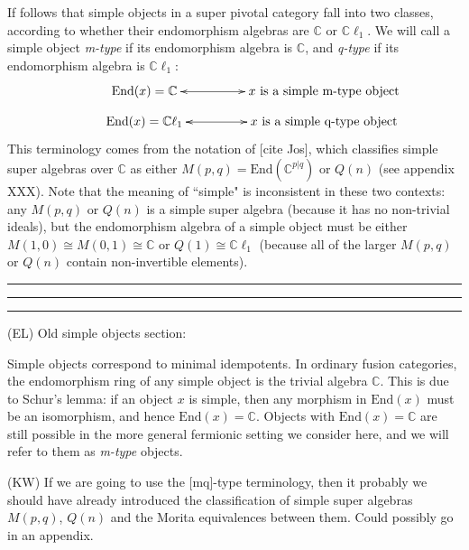 \documentclass[12pt,a4paper]{article}
\newcommand{\cc}{\mathbb{C}}
\newcommand{\End}{\text{End}}
\newcommand{\cl}{\mathbb{C}\ell}
\newcommand{\ethan}[1]{{\color{amethyst}\footnotesize{(EL) #1}}}
\newcommand{\kw}[1]{{\color{kwcolor}\footnotesize{(KW) #1}}}
\newcommand{\kwsep}{\bigskip\hrule\medskip\hrule\medskip\hrule\bigskip}
\begin{document}
If follows that simple objects in a super pivotal category fall into two classes, according to whether their endomorphism algebras are $\cc$ or $\cl_1$. 
We will call a simple object {\it m-type} if its endomorphism algebra
is $\cc$, and {\it q-type} if its endomorphism algebra is $\cl_1$:
\begin{align}
\vcenter{\xymatrix @!0 @M=1mm @C=25mm{
& \text{End}(x) = \mathbb{C} \ar@{<->}[rr] &   &\text{$x$ is a simple m-type object}&  \\
&\text{End}(x) = \mathbb{C} \ell_1 \ar@{<->}[rr]  &  &\text{$x$ is a simple q-type object}&
	}}
\end{align}
This terminology comes from the notation of [cite Jos], which classifies simple super algebras over $\cc$ as either
$M(p,q) = \End(\cc^{p|q})$ or $Q(n)$ (see appendix XXX).
Note that the meaning of ``simple" is inconsistent in these two contexts: any $M(p,q)$ or $Q(n)$ is a simple super algebra
(because it has no non-trivial ideals), but the endomorphism algebra of a simple object must be either
$M(1,0) \cong M(0,1) \cong \cc$ or $Q(1) \cong \cl_1$ 
(because all of the larger $M(p,q)$ or $Q(n)$ contain non-invertible elements).

\kwsep

\ethan{Old simple objects section:}

\medskip


Simple objects correspond to minimal idempotents.
In ordinary fusion categories, the endomorphism ring of any simple object is the trivial algebra $\cc$. 
This is due to Schur's lemma: if an object $x$ is simple, then any morphism in $\End(x)$ 
must be an isomorphism, and hence $\End(x) = \cc$. 
Objects with $\End(x) = \cc$ are still possible in the more general fermionic setting we consider here, 
and we will refer to them as {\it m-type} objects.

\kw{If we are going to use the [mq]-type terminology, then it probably we should have already introduced
the classification of simple super algebras $M(p,q)$, $Q(n)$ and the Morita equivalences between them.
Could possibly go in an appendix.}
\end{document}
